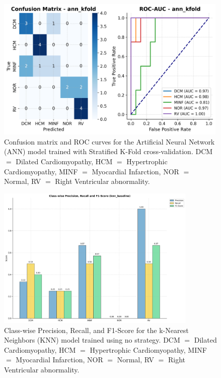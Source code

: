 \begin{figure}
	\begin{center}
		\includegraphics[width=0.99\textwidth]{../images/metrics/ann/ann_kfold_metrics.png}
	\end{center}
	\caption{Confusion matrix and ROC curves for the Artificial Neural Network
		(ANN) model trained with Stratified K-Fold cross-validation. DCM $=$ Dilated
		Cardiomyopathy, HCM $=$ Hypertrophic Cardiomyopathy, MINF $=$ Myocardial
		Infarction, NOR $=$ Normal, RV $=$ Right Ventricular abnormality.}
\end{figure}

\begin{figure}
	\begin{center}
		\includegraphics[width=0.85\textwidth]{../images/metrics/knn/knn_baseline_class_wise_metrics.png}
	\end{center}
	\caption{Class-wise Precision, Recall, and F1-Score for the k-Nearest
		Neighbors (KNN) model trained using no strategy. DCM $=$ Dilated
		Cardiomyopathy, HCM $=$ Hypertrophic Cardiomyopathy, MINF $=$ Myocardial
		Infarction, NOR $=$ Normal, RV $=$ Right Ventricular abnormality.}
\end{figure}

